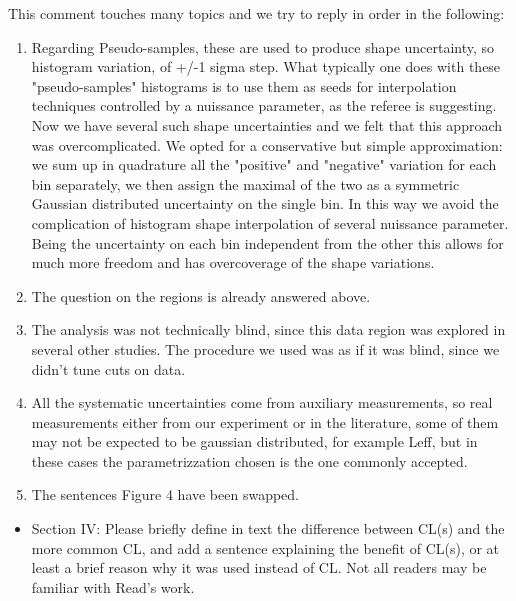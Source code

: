 \documentclass{article}
\begin{document}
This comment touches many topics and we try to reply in order in the following:
\begin{enumerate}
	\item Regarding Pseudo-samples, these are used to produce shape uncertainty, so histogram variation, of +/-1 sigma step. What typically one does with these "pseudo-samples" histograms  is to use them as seeds for interpolation techniques controlled by a nuissance parameter, as the referee is suggesting. Now we have several such shape uncertainties and we felt that this approach was overcomplicated. We opted for a conservative but simple approximation: we sum up in quadrature all the "positive" and "negative" variation for each bin separately, we then assign the maximal of the two as a symmetric Gaussian distributed uncertainty on the single bin.  In this way we avoid the complication of histogram shape interpolation of several nuissance parameter. Being the uncertainty on each bin independent from the other this allows for much more freedom and has overcoverage of the shape variations.
	
	\item The question on the regions is already answered above. 
	
	\item The analysis was not technically blind, since this data region was explored in several 
other studies. The procedure we used was as if it was blind, since we didn't tune cuts on data.

	\item All the systematic uncertainties come from auxiliary measurements, so real measurements either from our experiment or in the literature, some of them may not be expected to be gaussian distributed,
for example Leff, but in these cases the parametrizzation chosen is the one commonly accepted.

	\item The sentences Figure 4 have been swapped.
\end{enumerate}





\begin{itemize}
	\item {\color{blue} Section IV: Please briefly define in text the difference between CL(s)
and the more common CL, and add a sentence explaining the benefit of
CL(s), or at least a brief reason why it was used instead of CL. Not
all readers may be familiar with Read’s work.}
\end{itemize}
\end{document}
